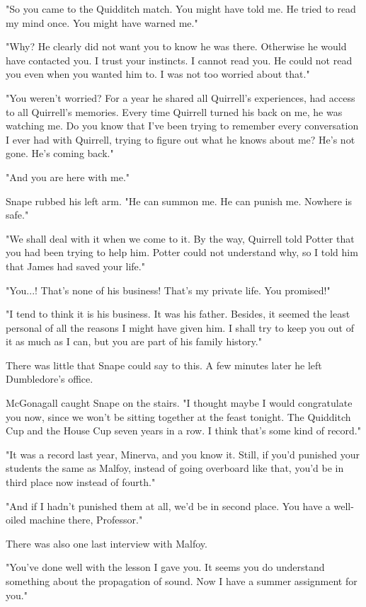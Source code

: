 "So you came to the Quidditch match. You might have told me. He tried to read my mind once. You might have warned me."

"Why? He clearly did not want you to know he was there. Otherwise he would have contacted you. I trust your instincts. I cannot read you. He could not read you even when you wanted him to. I was not too worried about that."

"You weren't worried? For a year he shared all Quirrell's experiences, had access to all Quirrell's memories. Every time Quirrell turned his back on me, he was watching me. Do you know that I've been trying to remember every conversation I ever had with Quirrell, trying to figure out what he knows about me? He's not gone. He's coming back."

"And you are here with me."

Snape rubbed his left arm. "He can summon me. He can punish me. Nowhere is safe."

"We shall deal with it when we come to it. By the way, Quirrell told Potter that you had been trying to help him. Potter could not understand why, so I told him that James had saved your life."

"You...! That's none of his business! That's my private life. You promised!"

"I tend to think it is his business. It was his father. Besides, it seemed the least personal of all the reasons I might have given him. I shall try to keep you out of it as much as I can, but you are part of his family history."

There was little that Snape could say to this. A few minutes later he left Dumbledore's office.

McGonagall caught Snape on the stairs. "I thought maybe I would congratulate you now, since we won't be sitting together at the feast tonight. The Quidditch Cup and the House Cup seven years in a row. I think that's some kind of record."

"It was a record last year, Minerva, and you know it. Still, if you'd punished your students the same as Malfoy, instead of going overboard like that, you'd be in third place now instead of fourth."

"And if I hadn't punished them at all, we'd be in second place. You have a well-oiled machine there, Professor."

There was also one last interview with Malfoy.

"You've done well with the lesson I gave you. It seems you do understand something about the propagation of sound. Now I have a summer assignment for you."

